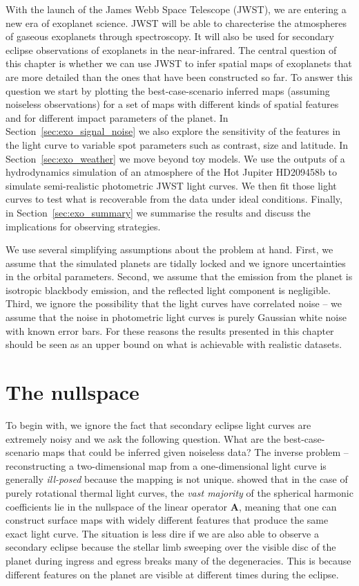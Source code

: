 \documentclass[12pt,dvipsnames]{report}
\begin{document}
With the launch of the James Webb Space Telescope (JWST), we are entering a new era of exoplanet 
science. JWST will be able to charecterise the atmospheres of gaseous exoplanets through 
spectroscopy. 
It will also be used for secondary eclipse observations of exoplanets 
in the near-infrared. The central question of this chapter is whether we can use JWST 
to infer spatial maps of exoplanets that are more detailed than the ones that have been constructed 
so far.
To answer this question we start by plotting the 
best-case-scenario inferred maps (assuming noiseless observations) for a set of maps 
with different kinds of spatial features and for different impact parameters of the planet. 
In Section~\ref{sec:exo_signal_noise} we also explore the sensitivity of the features in the light curve to variable spot parameters such
as contrast, size and latitude. 
In Section~\ref{sec:exo_weather} we move beyond toy models. We 
use the outputs of a hydrodynamics simulation of an
atmosphere of the Hot Jupiter HD209458b to simulate semi-realistic photometric JWST light
curves. We then fit those light curves to test what is recoverable from the data under 
ideal conditions.
Finally, in Section~\ref{sec:exo_summary} we summarise the results and discuss the  
implications for observing strategies.

We use several simplifying assumptions about the problem at hand. 
First, we assume that the simulated planets are tidally locked and we ignore uncertainties in the
orbital parameters. Second, we assume that the emission from the planet is isotropic 
blackbody emission, and the reflected light component is negligible. Third, we ignore 
the possibility that the light curves have correlated noise -- we assume that the noise 
in photometric light curves is purely Gaussian white noise with known error bars.
For these reasons the results presented in this chapter should be seen as an upper bound 
on what is achievable with realistic datasets.

\section{The nullspace}
\label{sec:exo_nullspace}
To begin with, we ignore the fact that secondary eclipse light curves are extremely noisy 
and we ask the following question. What are the best-case-scenario maps that could be inferred 
given noiseless data?
The inverse problem -- reconstructing a two-dimensional map from a one-dimensional light curve is
generally \emph{ill-posed} because the mapping is not unique.
\citet{2021AJ....162..123L} showed that in the case of purely rotational thermal light curves, the
\emph{vast majority} of the spherical harmonic coefficients lie in the nullspace of the
linear operator $\mathbf{A}$, meaning that one can construct surface maps with widely different
features that produce the same exact light curve.
The situation is less dire if we are also able to observe a secondary eclipse because the stellar
limb sweeping over the visible disc of the planet during ingress and egress
breaks many of the degeneracies. 
This is because different features on the planet are visible at different times during the
eclipse.
\end{document}
